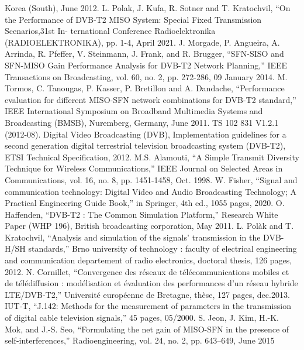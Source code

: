 \documentclass[10pt, conference]{IEEEtran}
\begin{document}
\begin{thebibliography}{99}
Korea (South), June 2012.
 L. Polak, J. Kufa, R. Sotner and T. Kratochvil, “On the Performance of
DVB-T2 MISO System: Special Fixed Transmission Scenarios,31st In-
ternational Conference Radioelektronika (RADIOELEKTRONIKA), pp.
1-4, April 2021.
 J. Morgade, P. Angueira, A. Arrinda, R. Pfeffer, V. Steinmann, J. Frank,
and R. Brugger, “SFN-SISO and SFN-MISO Gain Performance Analysis
for DVB-T2 Network Planning,” IEEE Transactions on Broadcasting,
vol. 60, no. 2, pp. 272-286, 09 January 2014.
 M. Tormos, C. Tanougas, P. Kasser, P. Bretillon and A. Dandache,
“Performance evaluation for different MISO-SFN network combinations
for DVB-T2 standard,” IEEE International Symposium on Broadband
Multimedia Systems and Broadcasting (BMSB), Nuremberg, Germany,
June 2011.
 TS 102 831 V1.2.1 (2012-08). Digital Video Broadcasting (DVB),
Implementation guidelines for a second generation digital terrestrial
television broadcasting system (DVB-T2), ETSI Technical Specification,
2012.
 M.S. Alamouti, “A Simple Transmit Diversity Technique for Wireless
Communications,” IEEE Journal on Selected Areas in Communications,
vol. 16, no. 8, pp. 1451-1458, Oct. 1998.
 W. Fisher, “Signal and communication technology: Digital Video and
Audio Broadcasting Technology; A Practical Engineering Guide Book,”
in Springer, 4th ed., 1055 pages, 2020.
 O. Haffenden, “DVB-T2 : The Common Simulation Platform,” Research
White Paper (WHP 196), British broadcasting corporation, May 2011.
 L. Polàk and T. Kratochvil, “Analysis and simulation of the signals’
transmission in the DVB-H/SH standards,” Brno university of technology
: faculty of electrical engineering and communication departement of
radio electronics, doctoral thesis, 126 pages, 2012.
N. Cornillet, “Convergence des réseaux de télécommunications mobiles
et de télédiffusion : modélisation et évaluation des performances d’un
réseau hybride LTE/DVB-T2,” Université européenne de Bretagne,
thèse, 127 pages, dec.2013.
 IUT-T, “J.142: Methods for the measurement of parameters in the
transmission of digital cable television signals,” 45 pages, 05/2000.
 S. Jeon, J. Kim, H.-K. Mok, and J.-S. Seo, “Formulating the net gain
of MISO-SFN in the presence of self-interferences,” Radioengineering,
vol. 24, no. 2, pp. 643–649, June 2015
\end{thebibliography}
\end{document}
